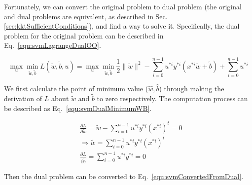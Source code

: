 \documentclass[runningheads,openany]{xhlPaper}
\begin{document}
Fortunately, we can convert the original problem to dual problem (the original and dual problems are equivalent, as described in Sec.\ref{sec:kktSufficientConditions}), and find a way to solve it. Specifically, the dual problem for the original problem can be described in Eq.~\ref{equ:svmLagrangeDualOO}.

\begin{equation}
\label{equ:svmLagrangeDualOO}
\mathop {\max }\limits_u \mathop {\min }\limits_{\tilde w,\tilde b} L\left( {\tilde w,\tilde b,u} \right) = \mathop {\max }\limits_u \mathop {\min }\limits_{\tilde w,\tilde b} \frac{1}{2}\parallel \tilde w{\parallel ^2} - \sum\limits_{i = 0}^{n - 1} {{u^{*i}}{y^{*i}}\left( {{x^{*i}}\tilde w + \tilde b} \right)}  + \sum\limits_{i = 0}^{n - 1} {{u^{*i}}} 
\end{equation}

We first calculate the point of minimum value (${\hat w}, {\hat b}$) through making the derivation of $L$ about ${\tilde w}$ and $\tilde b$ to zero respectively. The computation process can be described as Eq.~\ref{equ:svmDualMinimumWB}.

\begin{equation}
\label{equ:svmDualMinimumWB}
\begin{aligned}
&\frac{{\partial L}}{{\partial \tilde w}} = \tilde w - \sum\limits_{i = 0}^{n - 1} {{u^{*i}}{y^{*i}}{{\left( {{x^{*i}}} \right)}^t}}  = 0\\
& \Rightarrow \tilde w = \sum\limits_{i = 0}^{n - 1} {{u^{*i}}{y^{*i}}{{\left( {{x^{*i}}} \right)}^t}} \\
&\frac{{\partial L}}{{\partial \tilde b}} = \sum\limits_{i = 0}^{n - 1} {{u^{*i}}{y^{*i}}}  = 0
\end{aligned}
\end{equation}

Then the dual problem can be converted to Eq.~\ref{equ:svmConvertedFromDual}.
\end{document}
